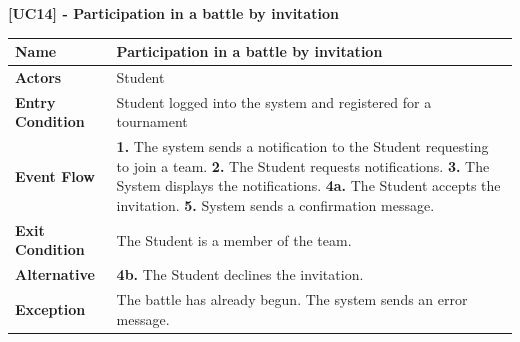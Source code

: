 \clearpage
\raggedright
\textbf{[UC14] - Participation in a battle by invitation}
\begin{table}[h]
\begin{tabular}{|l|p{12cm}|} \hline 

\rule[-3mm]{0mm}{1cm}
\textbf{Name} &  Participation in a battle by invitation \\ \hline 

\rule[-3mm]{0mm}{1cm}
\textbf{Actors} & Student \\ \hline 

\rule[-3mm]{0mm}{1cm}
\textbf{Entry Condition} & Student logged into the system and registered for a tournament
\vspace{2pt}
\\ \hline 

\rule[-3mm]{0mm}{1cm}
\textbf{Event Flow} & 
\textbf{1.} The system sends a notification to the Student requesting to join a team.
\vspace{4pt}
\newline
\textbf{2.} The Student requests notifications.
\vspace{4pt}
\newline
\textbf{3.} The System displays the notifications.
\vspace{4pt}
\newline
\textbf{4a.} The Student accepts the invitation.
\vspace{4pt}
\newline
\textbf{5.} System sends a confirmation message. 

\\\hline 


\rule[-3mm]{0mm}{1cm}
\textbf{Exit Condition} & The Student is a member of the team. \\ \hline

\rule[-3mm]{0mm}{1cm}
\textbf{Alternative} & \textbf{4b.} The Student declines the invitation. \\ \hline

\rule[-3mm]{0mm}{1cm}
\textbf{Exception} & The battle has already begun. The system sends an error message. \\ \hline

\end{tabular}
\end{table}

